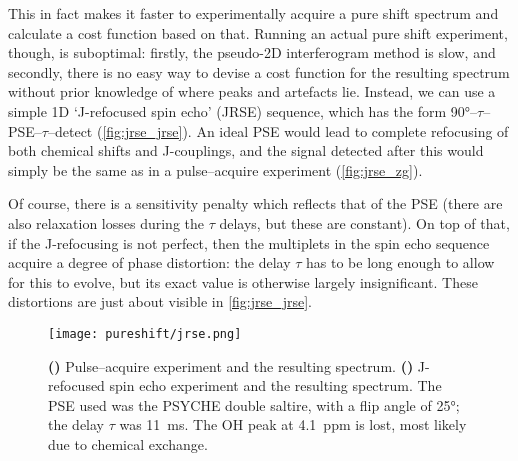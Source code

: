 This in fact makes it faster to experimentally acquire a pure shift spectrum and calculate a cost function based on that.
Running an actual pure shift experiment, though, is suboptimal: firstly, the pseudo-2D interferogram method is slow, and secondly, there is no easy way to devise a cost function for the resulting spectrum without prior knowledge of where peaks and artefacts lie.
Instead, we can use a simple 1D `J-refocused spin echo' (JRSE) sequence, which has the form \ang{90}--$\tau$--PSE--$\tau$--detect (\cref{fig:jrse_jrse}).
An ideal PSE would lead to complete refocusing of both chemical shifts and J-couplings, and the signal detected after this would simply be the same as in a pulse--acquire experiment (\cref{fig:jrse_zg}).

Of course, there is a sensitivity penalty which reflects that of the PSE (there are also relaxation losses during the $\tau$ delays, but these are constant).
On top of that, if the J-refocusing is not perfect, then the multiplets in the spin echo sequence acquire a degree of phase distortion: the delay $\tau$ has to be long enough to allow for this to evolve, but its exact value is otherwise largely insignificant.
These distortions are just about visible in \cref{fig:jrse_jrse}.

\begin{figure}[htbp]
    \centering
    \texttt{[image: pureshift/jrse.png]}
    {\label{fig:jrse_zg}}
    {\label{fig:jrse_jrse}}
    \caption[J-refocused spin echo experiment]{
        \textbf{()} Pulse--acquire experiment and the resulting spectrum.
        \textbf{()} J-refocused spin echo experiment and the resulting spectrum.
        The PSE used was the PSYCHE double saltire, with a flip angle of \ang{25}; the delay $\tau$ was \SI{11}{\ms}.
        The OH peak at \SI{4.1}{ppm} is lost, most likely due to chemical exchange.
    }
    \label{fig:jrse}
\end{figure}

